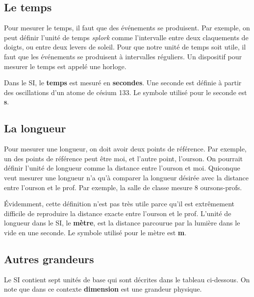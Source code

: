 \subsection{Le temps}

Pour mesurer le temps, il faut que des événements se produisent.  Par exemple,
on peut définir l'unité de temps \emph{splork} comme l'intervalle entre deux
claquements de doigts, ou entre deux levers de soleil.  Pour que notre unité de
temps soit utile, il faut que les événements se produisent à intervalles
réguliers.  Un dispositif pour mesurer le temps est appelé une horloge.

Dans le SI, le \textbf{temps} est mesuré en \textbf{secondes}.
 Une seconde
est définie à partir des oscillations d'un atome de césium 133.  Le symbole
utilisé pour le seconde est \textbf{s}.

\subsection{La longueur}

Pour mesurer une longueur, on doit avoir deux points de référence.  Par
exemple, un des points de référence peut être moi, et l'autre point, l'ourson.
On pourrait définir l'unité de longueur comme la distance entre l'ourson et
moi.  Quiconque veut mesurer une longueur n'a qu'à comparer la longueur désirée
avec la distance entre l'ourson et le prof.  Par exemple, la salle de classe
mesure 8 oursons-profs.

Évidemment, cette définition n'est pas très utile parce qu'il est extrêmement
 difficile de
reproduire la distance exacte entre l'ourson et le prof.  L'unité de longueur
dans le SI, le \textbf{mètre}, est la distance parcourue par la lumière dans le
vide en une seconde.  Le symbole utilisé pour le mètre est \textbf{m}.

\subsection{Autres grandeurs}

Le SI contient sept unités de base qui sont décrites dans le tableau
ci-dessous.  On note que dans ce contexte \textbf{dimension} est une
grandeur physique.

